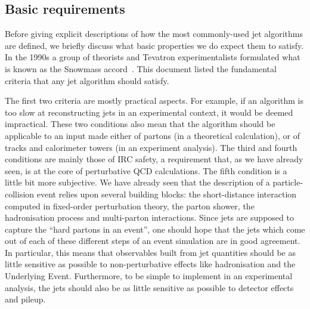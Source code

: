 \subsection{Basic requirements}\label{sec:jetalgs-snowmass}

Before giving explicit descriptions of how the most commonly-used jet
algorithms are defined, we briefly discuss what basic properties we do
expect them to satisfy.
%
In the 1990s a group of theorists and Tevatron experimentalists
formulated what is known as the Snowmass accord~\cite{Huth:1990mi}. This document
listed the fundamental criteria that any jet algorithm should
satisfy.

\vspace*{0.3cm}\noindent\centerline{}\vspace*{0.3cm}

The first two criteria are mostly practical aspects. For example, if
an algorithm is too slow at reconstructing jets in an experimental
context, it would be deemed impractical. These two conditions also
mean that the algorithm should be applicable to an input made either
of partons (in a theoretical calculation), or of tracks and
calorimeter towers (in an experiment analysis).
%
The third and fourth conditions are mainly those of
IRC safety, a requirement that, as we have already seen, is at the core of
perturbative QCD calculations.
%
The fifth condition is a little bit more subjective.  We have already
seen that the description of a particle-collision event relies upon
several building blocks: the short-distance interaction computed in
fixed-order perturbation theory, the parton shower, the hadronisation
process and multi-parton interactions.
%
Since jets are supposed to capture the ``hard partons in an event'',
one should hope that the jets which come out of each of these
different steps of an event simulation are in good agreement. In
particular, this means that observables built from jet quantities
should be as little sensitive as possible to non-perturbative effects
like hadronisation and the Underlying Event.
%
Furthermore, to be simple to implement in an experimental analysis,
the jets should also be as little sensitive as possible to detector
effects and pileup.

